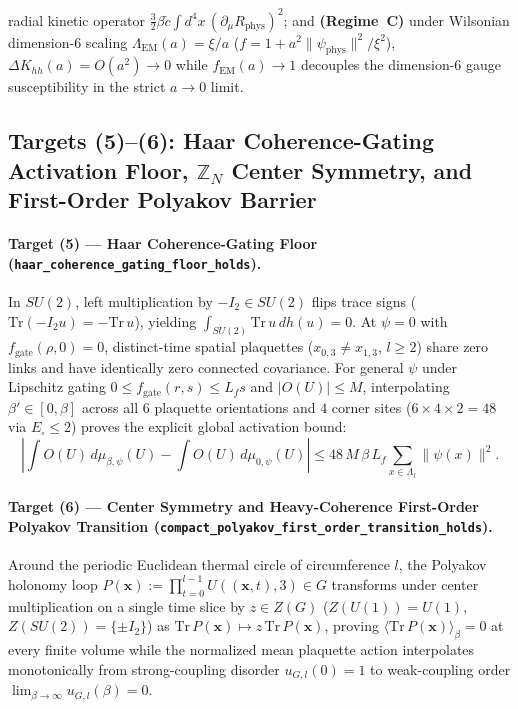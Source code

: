 radial kinetic operator $\frac{3}{2}\beta\tilde{c}\int d^4x\,(\partial_\mu R_{\mathrm{phys}})^2$; and \textbf{(Regime~C)} under Wilsonian dimension-$6$ scaling $\Lambda_{\mathrm{EM}}(a)=\xi/a$ ($f = 1 + a^2\|\psi_{\mathrm{phys}}\|^2/\xi^2$), $\Delta K_{hh}(a) = O(a^2)\to 0$ while $f_{\mathrm{EM}}(a)\to 1$ decouples the dimension-$6$ gauge susceptibility in the strict $a\to 0$ limit.

\subsection{Targets (5)--(6): Haar Coherence-Gating Activation Floor, $\mathbb{Z}_N$ Center Symmetry, and First-Order Polyakov Barrier}

\paragraph{Target (5) --- Haar Coherence-Gating Floor (\texttt{haar\_coherence\_gating\_floor\_holds}).}
In $SU(2)$, left multiplication by $-I_2 \in SU(2)$ flips trace signs ($\mathrm{Tr}(-I_2 u) = -\mathrm{Tr}\,u$), yielding $\int_{SU(2)}\mathrm{Tr}\,u\,dh(u) = 0$. At $\psi = 0$ with $f_{\mathrm{gate}}(\rho,0) = 0$, distinct-time spatial plaquettes ($x_{0,3} \ne x_{1,3}$, $l \ge 2$) share zero links and have identically zero connected covariance. For general $\psi$ under Lipschitz gating $0 \le f_{\mathrm{gate}}(r,s) \le L_f s$ and $|O(U)| \le M$, interpolating $\beta' \in [0,\beta]$ across all $6$ plaquette orientations and $4$ corner sites ($6 \times 4 \times 2 = 48$ via $E_\square \le 2$) proves the explicit global activation bound:
\begin{equation}
\left|\int O(U)\,d\mu_{\beta,\psi}(U) - \int O(U)\,d\mu_{0,\psi}(U)\right|
\le 48\,M\,\beta\,L_f\sum_{x\in\Lambda_l}\|\psi(x)\|^2.
\label{eq:haar_48_bound_sec53}
\end{equation}

\paragraph{Target (6) --- Center Symmetry and Heavy-Coherence First-Order Polyakov Transition (\texttt{compact\_polyakov\_first\_order\_transition\_holds}).}
Around the periodic Euclidean thermal circle of circumference $l$, the Polyakov holonomy loop $P(\mathbf{x}) := \prod_{t=0}^{l-1} U((\mathbf{x},t), 3) \in G$ transforms under center multiplication on a single time slice by $z \in Z(G)$ ($Z(U(1)) = U(1)$, $Z(SU(2)) = \{\pm I_2\}$) as $\mathrm{Tr}\,P(\mathbf{x}) \mapsto z\,\mathrm{Tr}\,P(\mathbf{x})$, proving $\langle\mathrm{Tr}\,P(\mathbf{x})\rangle_{\beta} = 0$ at every finite volume while the normalized mean plaquette action interpolates monotonically from strong-coupling disorder $u_{G,l}(0) = 1$ to weak-coupling order $\lim_{\beta\to\infty} u_{G,l}(\beta) = 0$.

